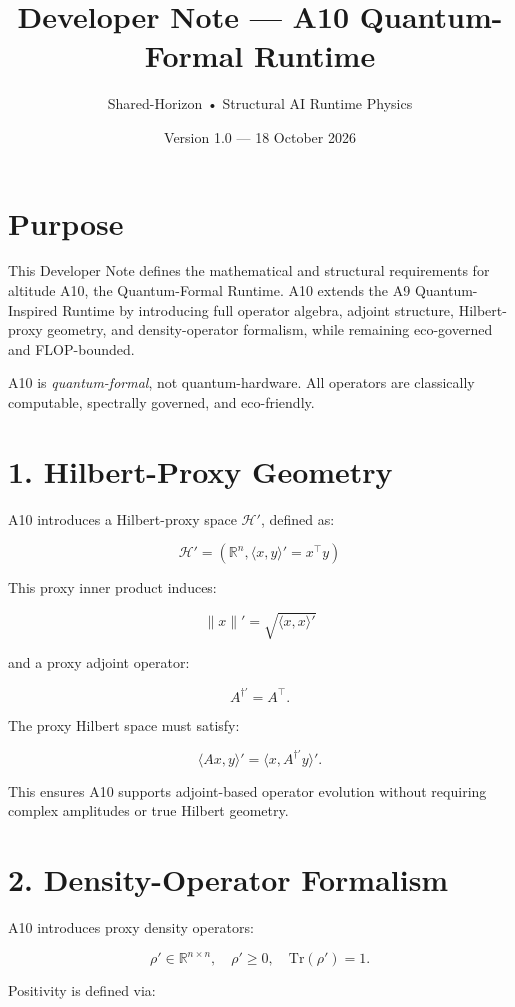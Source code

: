 \documentclass[11pt]{article}
\title{Developer Note — A10 Quantum-Formal Runtime}
\author{Shared-Horizon • Structural AI Runtime Physics}
\date{Version 1.0 — 18 October 2026}
\begin{document}
\maketitle

\section*{Purpose}

This Developer Note defines the mathematical and structural requirements
for altitude A10, the Quantum-Formal Runtime. A10 extends the A9
Quantum-Inspired Runtime by introducing full operator algebra, adjoint
structure, Hilbert-proxy geometry, and density-operator formalism,
while remaining eco-governed and FLOP-bounded.

A10 is \emph{quantum-formal}, not quantum-hardware. All operators are
classically computable, spectrally governed, and eco-friendly.

\section*{1. Hilbert-Proxy Geometry}

A10 introduces a Hilbert-proxy space \( \mathcal{H}' \), defined as:

\[
\mathcal{H}' = (\mathbb{R}^n, \langle x, y \rangle' = x^\top y)
\]

This proxy inner product induces:

\[
\|x\|' = \sqrt{\langle x, x \rangle'}
\]

and a proxy adjoint operator:

\[
A^{\dagger'} = A^\top.
\]

The proxy Hilbert space must satisfy:

\[
\langle Ax, y \rangle' = \langle x, A^{\dagger'} y \rangle'.
\]

This ensures A10 supports adjoint-based operator evolution without
requiring complex amplitudes or true Hilbert geometry.

\section*{2. Density-Operator Formalism}

A10 introduces proxy density operators:

\[
\rho' \in \mathbb{R}^{n \times n}, \quad \rho' \ge 0, \quad \mathrm{Tr}(\rho') = 1.
\]

Positivity is defined via:
\end{document}
